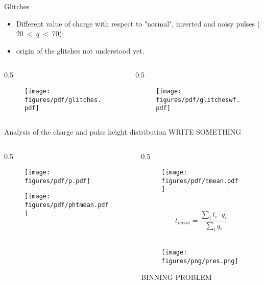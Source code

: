 \documentclass{beamer}[10pt]
\begin{document}
\begin{frame}{Glitches}
\begin{itemize}
\item Different value of charge with respect to "normal", inverted and noisy pulses ($20 \ < \ q \ < \ 70$);
\item origin of the glitches not understood yet.
\end{itemize}
\begin{columns}
\begin{column}{0.5 \framewidth}
\begin{figure}[H]
   \centering
   \texttt{[image: figures/pdf/glitches.pdf]}
   \label{fig:wffytl}
 \end{figure}
\end{column}
\begin{column}{0.5\framewidth}
\begin{figure}[H]
   \centering
   \texttt{[image: figures/pdf/glitcheswf.pdf]}
   \label{fig:wffytl}
 \end{figure}
\end{column}
\end{columns}
\end{frame}
\begin{frame}{Analysis of the charge and pulse height distribution}
WRITE SOMETHING
\vspace{-6mm}
\begin{columns}
\begin{column}{0.5\framewidth}
\begin{figure}[H]
   \centering
   \texttt{[image: figures/pdf/p.pdf]}
   \label{fig:wffytl}
 \end{figure}
\vspace{-8mm}
\begin{figure}[H]
   \centering
   \texttt{[image: figures/pdf/phtmean.pdf]}
   \label{fig:wffytl}
 \end{figure}
\end{column}
\begin{column}{0.5\framewidth}
\begin{figure}[H]
   \centering
   \texttt{[image: figures/pdf/tmean.pdf]}
   \label{fig:wffytl}
 \end{figure}
\vspace{-7mm}
\\
{\tiny $$t_{mean}=\frac{\sum_i t_i \cdot q_i}{\sum_i q_i}$$}
\\
\vspace{-7mm}
\begin{figure}[H]
   \centering
   \texttt{[image: figures/png/pres.png]}
   \label{fig:wffytl}
 \end{figure}
BINNING PROBLEM
\end{column}
\end{columns}
\end{frame}
\end{document}
